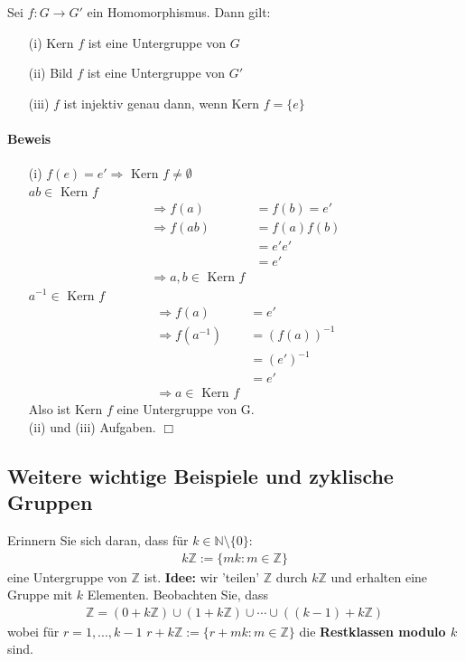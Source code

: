 \documentclass[11pt]{report}
\newcommand*\Zb[1] {\mathbb{#1}}
\newcommand*\f[1] {\textbf{#1}}
\begin{document}
\begin{lemma}
\label{lemma221}
 Sei $f: G \rightarrow G'$ ein Homomorphismus.
Dann gilt:
\begin{itemize}
 \item[(i)] Kern $f$ ist eine Untergruppe von $G$
 \item[(ii)] Bild $f$ ist eine Untergruppe von $G'$
 \item[(iii)] $f$ ist injektiv genau dann, wenn Kern $f = \{e\}$
\end{itemize}
\end{lemma}
\paragraph{Beweis}
\begin{itemize}
 \item[(i)] $f(e) = e' \Rightarrow$ Kern $f \neq \emptyset$\\
$ab \in$ Kern $f$
\begin{align}
 \Rightarrow f(a) &= f(b) = e' \\
 \Rightarrow f(ab) &= f(a)f(b)  \\
 &= e'e'\\
 &= e' \\
\Rightarrow a,b\in \textrm{ Kern } f
\end{align}
$a^{-1} \in$ Kern $f$
\begin{align}
 \Rightarrow f(a) &= e' \\
 \Rightarrow f(a^{-1}) &= (f(a))^{-1}  \\
 & =(e')^{-1}\\
 & = e' \\
\Rightarrow a \in \textrm{ Kern } f
\end{align}
Also ist Kern $f$ eine Untergruppe von G.\\
(ii) und (iii) Aufgaben. \hfill $\Box$
\end{itemize}

\subsection{Weitere wichtige Beispiele und zyklische Gruppen}
Erinnern Sie sich daran, dass für $k \in \Zb{N} \setminus \{0\}$:
\begin{align}
 k\Zb{Z}:= \{mk: m \in \Zb{Z}\}
\end{align}
eine Untergruppe von $\Zb{Z}$ ist. \f{Idee:} wir 'teilen' $\Zb{Z}$ durch $k\Zb{Z}$ und erhalten eine Gruppe mit $k$ Elementen.
Beobachten Sie, dass 
\begin{align}
 \Zb{Z} = (0+k\Zb{Z})\cup(1+k\Zb{Z})\cup \cdots \cup ((k-1)+k\Zb{Z})
\end{align}
wobei für $r=1, ..., k-1$ $r+k\Zb{Z} := \{r + mk : m \in \Zb{Z}\}$ die \f{Restklassen modulo $k$} sind.
\end{document}
